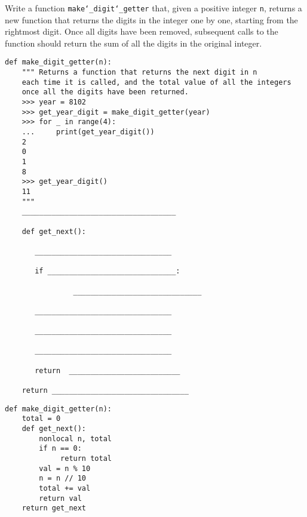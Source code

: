 \begin{blocksection}
\question Write a function \texttt{make\char`_digit\char`_getter} that, given a positive integer \texttt{n}, returns a new function that returns the digits in the integer  
one by one, starting from the rightmost digit. Once all digits have been removed, subsequent calls to the function should return the sum of all the digits in the original integer.

\begin{lstlisting}
def make_digit_getter(n):
    """ Returns a function that returns the next digit in n
    each time it is called, and the total value of all the integers
    once all the digits have been returned.
    >>> year = 8102
    >>> get_year_digit = make_digit_getter(year)
    >>> for _ in range(4):
    ...     print(get_year_digit())
    2
    0
    1
    8
    >>> get_year_digit()
    11
    """
    ____________________________________

    def get_next():
        
       ________________________________
        
       if ______________________________:

                ______________________________
        
       ________________________________
        
       ________________________________
			
       ________________________________
       
       return  __________________________

    return ________________________________
\end{lstlisting}

\begin{solution}
\begin{lstlisting}
def make_digit_getter(n):
    total = 0
    def get_next():
        nonlocal n, total
        if n == 0:
             return total
        val = n % 10
        n = n // 10
        total += val
        return val
    return get_next
\end{lstlisting}
\end{solution}

\end{blocksection}
